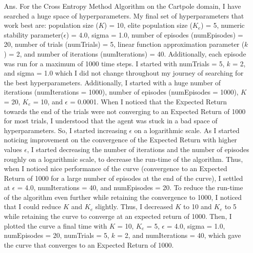 \documentclass[]{article}
\begin{document}
\begin{enumerate}
	{
		\color{blue}
		Ans. For the Cross Entropy Method Algorithm on the Cartpole domain, I have searched a huge space of hyperparameters. My final set of hyperparameters that work best are: population size ($K$) = 10, elite population size ($K_e$) = 5, numeric stability parameter($\epsilon$) = 4.0, sigma = 1.0, number of episodes (numEpisodes) = 20, number of trials (numTrials) = 5, linear function approximation parameter ($k$) = 2, and number of iterations (numIterations) = 40. Additionally, each episode was run for a maximum of 1000 time steps. I started with numTrials = 5, $k$ = 2, and sigma = 1.0  which I did not change throughout my journey of searching for the best hyperparameters. Additionally,  I started with a huge number of iterations (numIterations = 1000), number of episodes (numEpisodes = 1000),  $K$ = 20, $K_e$ = 10, and $\epsilon$ = 0.0001. When I noticed that the Expected Return towards the end of the trials were not converging to an Expected Return of 1000 for most trials, I understood that the agent was stuck in a bad space of hyperparameters. So, I started increasing $\epsilon$ on a logarithmic scale. As I started noticing improvement on the convergence of the Expected Return with higher values $\epsilon$, I started decreasing the number of iterations and the number of episodes roughly on a logarithmic scale, to decrease the run-time of the algorithm. Thus, when I noticed nice performance of the curve (convergence to an Expected Return of 1000 for a large number of episodes at the end of the curve), I settled at $\epsilon$ = 4.0, numIterations = 40, and numEpisodes = 20. To reduce the run-time of the algorithm even further while retaining the convergence to 1000, I noticed that I could reduce $K$ and $K_e$ slightly. Thus, I decreased $K$ to 10 and $K_e$ to 5 while retaining the curve to converge at an expected return of 1000. Then, I plotted the curve a final time with  $K$ = 10, $K_e$ = 5, $\epsilon$ = 4.0, sigma = 1.0, numEpisodes = 20, numTrials = 5, $k$ = 2, and numIterations = 40, which gave the curve that converges to an Expected Return of 1000.
		
}
\end{enumerate}
\end{document}
